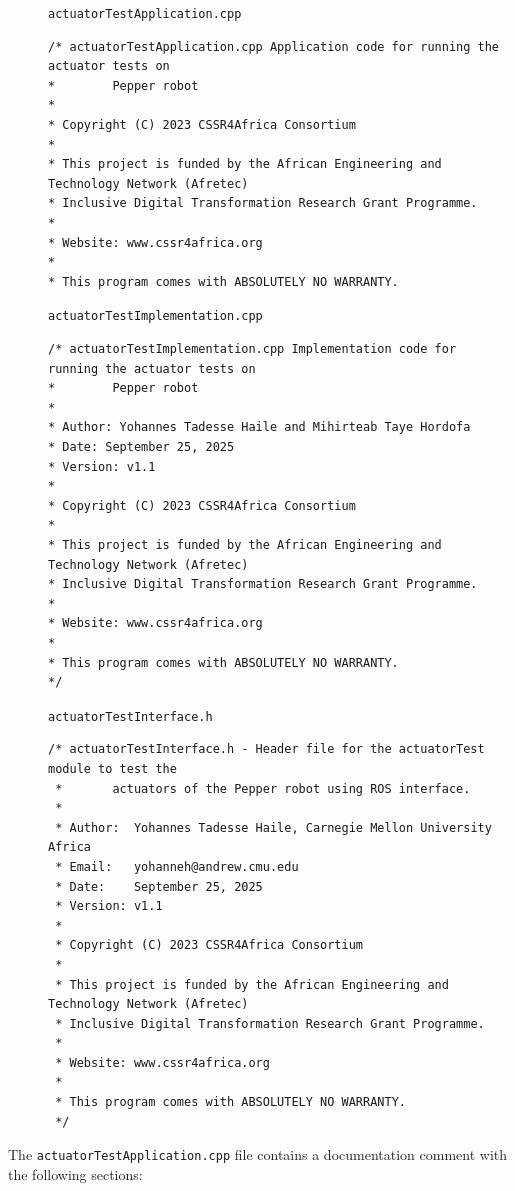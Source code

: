 \documentclass{CSSRforAfrica}
\newcommand{\checkboxChecked}{\fbox{\ding{51}}} %
\begin{document}
\begin{description}

\item[\checkboxChecked] {\small \verb+actuatorTestApplication.cpp+}
{\scriptsize \begin{verbatim}
/* actuatorTestApplication.cpp Application code for running the actuator tests on
*        Pepper robot
*
* Copyright (C) 2023 CSSR4Africa Consortium
*
* This project is funded by the African Engineering and Technology Network (Afretec)
* Inclusive Digital Transformation Research Grant Programme.
*
* Website: www.cssr4africa.org
*
* This program comes with ABSOLUTELY NO WARRANTY.
\end{verbatim} }

\item[\checkboxChecked]  {\small \verb+actuatorTestImplementation.cpp+}
{\scriptsize \begin{verbatim}
/* actuatorTestImplementation.cpp Implementation code for running the actuator tests on
*        Pepper robot
*
* Author: Yohannes Tadesse Haile and Mihirteab Taye Hordofa 
* Date: September 25, 2025
* Version: v1.1
*
* Copyright (C) 2023 CSSR4Africa Consortium
*
* This project is funded by the African Engineering and Technology Network (Afretec)
* Inclusive Digital Transformation Research Grant Programme.
*
* Website: www.cssr4africa.org
*
* This program comes with ABSOLUTELY NO WARRANTY.
*/
\end{verbatim} }

\item[\checkboxChecked] {\small \verb+actuatorTestInterface.h+}
{\scriptsize \begin{verbatim}
/* actuatorTestInterface.h - Header file for the actuatorTest module to test the
 *       actuators of the Pepper robot using ROS interface.
 *
 * Author:  Yohannes Tadesse Haile, Carnegie Mellon University Africa
 * Email:   yohanneh@andrew.cmu.edu
 * Date:    September 25, 2025
 * Version: v1.1
 *
 * Copyright (C) 2023 CSSR4Africa Consortium
 *
 * This project is funded by the African Engineering and Technology Network (Afretec)
 * Inclusive Digital Transformation Research Grant Programme.
 *
 * Website: www.cssr4africa.org
 *
 * This program comes with ABSOLUTELY NO WARRANTY.
 */
\end{verbatim} }

\end{description}

\noindent The {\small \verb+actuatorTestApplication.cpp+} file contains a documentation comment with the following sections:
\end{document}
